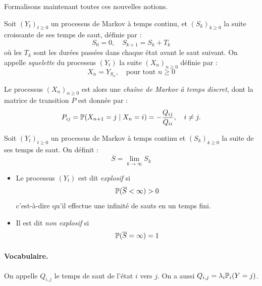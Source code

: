 Formalisons maintenant toutes ces nouvelles notions. 

\begin{definition}
    Soit $(Y_t)_{t \geqslant 0}$ un processus de Markov à temps continu, 
    et $(S_k)_{k \geqslant 0}$ la suite croissante de ses temps de saut, 
    définie par : 
        $$  S_0 = 0, \quad S_{k+1} = S_k + T_k $$
    où les $T_k$ sont les durées passées dans chaque état avant le saut suivant.
    On appelle \emph{squelette} du processus $(Y_t)$ la suite $(X_n)_{n \geqslant 0}$ définie par :
        $$ X_n = Y_{S_n}, \quad \text{pour tout } n \geqslant 0 $$

    Le processus $(X_n)_{n \geqslant 0}$ est alors une \emph{chaîne de Markov à temps discret}, 
    dont la matrice de transition $P$ est donnée par :
    $$
        P_{ij} = \mathbb{P}(X_{n+1} = j \mid X_n = i) 
        = - \frac{Q_{ij}}{Q_{ii}}, \quad i \neq j.
    $$
\end{definition}

\begin{definition}
    Soit $(Y_t)_{t \geqslant 0}$ un processus de Markov à temps continu et 
    $(S_k)_{k \geqslant 0}$ la suite de ses temps de saut. 
    On définit :
        $$ \overline{S} = \lim_{k \to \infty} S_k $$

    \begin{itemize}
        \item Le processus $(Y_t)$ est dit \emph{explosif} si 
            $$ \mathbb{P}(\overline{S} < \infty) > 0 $$
            c’est-à-dire qu’il effectue une infinité de sauts en un temps fini.
        \item Il est dit \emph{non explosif} si 
            $$ \mathbb{P}(\overline{S} = \infty) = 1 $$
    \end{itemize}
\end{definition}

\paragraph{Vocabulaire. } On appelle $Q_{i,j}$ le temps de saut de l'état $i$ vers $j$. On a aussi 
$Q_{i,j} = \lambda_i \mathbb{P}_i(Y = j)$. 

